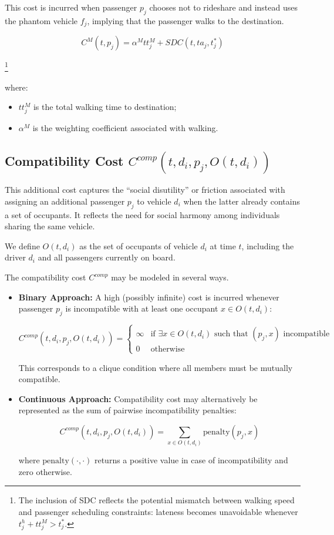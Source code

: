 \documentclass[12pt, a4paper]{article}
\begin{document}
This cost is incurred when passenger $p_j$ chooses not to rideshare and instead uses the phantom vehicle $f_j$, implying that the passenger walks to the destination.

$$
C^M(t,p_j)=
\alpha^M tt_j^M
+
SDC(t,ta_j,t_j^*)
$$

\footnote{
The inclusion of SDC reflects the potential mismatch between walking speed and passenger scheduling constraints: lateness becomes unavoidable whenever $t_j^h+tt_j^M>t_j^*$.
}

where:

\begin{itemize}
    \item $tt_j^M$ is the total walking time to destination;

    \item $\alpha^M$ is the weighting coefficient associated with walking.
\end{itemize}

\subsection{Compatibility Cost $C^{comp}(t,d_i,p_j,O(t,d_i))$}

This additional cost captures the ``social disutility'' or friction associated with assigning an additional passenger $p_j$ to vehicle $d_i$ when the latter already contains a set of occupants. It reflects the need for social harmony among individuals sharing the same vehicle.

We define $O(t,d_i)$ as the set of occupants of vehicle $d_i$ at time $t$, including the driver $d_i$ and all passengers currently on board.

The compatibility cost $C^{comp}$ may be modeled in several ways.

\begin{itemize}

    \item \textbf{Binary Approach:}
    A high (possibly infinite) cost is incurred whenever passenger $p_j$ is incompatible with at least one occupant $x\in O(t,d_i)$:

$$
C^{comp}(t,d_i,p_j,O(t,d_i))
=
\begin{cases}
\infty
&
\text{if }\exists x\in O(t,d_i)
\text{ such that }(p_j,x)\text{ incompatible}
\\
0
&
\text{otherwise}
\end{cases}
$$

This corresponds to a clique condition where all members must be mutually compatible.

    \item \textbf{Continuous Approach:}
    Compatibility cost may alternatively be represented as the sum of pairwise incompatibility penalties:

$$
C^{comp}(t,d_i,p_j,O(t,d_i))
=
\sum_{x\in O(t,d_i)}
\text{penalty}(p_j,x)
$$

where $\text{penalty}(\cdot,\cdot)$ returns a positive value in case of incompatibility and zero otherwise.

\end{itemize}
\end{document}

